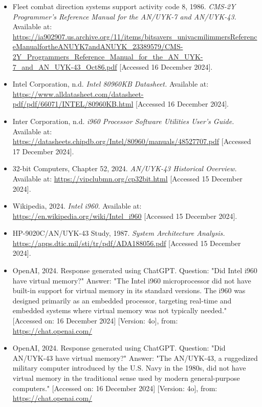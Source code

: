 \documentclass{article}
\begin{document}
\begin{itemize}
\item Fleet combat direction systems support activity code 8, 1986. \textit{CMS-2Y Programmer's Reference Manual for the AN/UYK-7 and AN/UYK-43.} Available at: \url{https://ia902907.us.archive.org/11/items/bitsavers_univacmilimmersReferenceManualfortheANUYK7andANUYK_23389579/CMS-2Y_Programmers_Reference_Manual_for_the_AN_UYK-7_and_AN_UYK-43_Oct86.pdf} [Accessed 16 December 2024].

\item Intel Corporation, n.d. \textit{Intel 80960KB Datasheet.} Available at: \url{https://www.alldatasheet.com/datasheet-pdf/pdf/66071/INTEL/80960KB.html} [Accessed 16 December 2024].

\item Inter Corporation, n.d. \textit{i960 Processor Software Utilities
User’s Guide.} Available at: \url{https://datasheets.chipdb.org/Intel/80960/manuals/48527707.pdf} [Accessed 17 December 2024].


\item 32-bit Computers, Chapter 52, 2024. \textit{AN/UYK-43 Historical Overview.} Available at: \url{https://vipclubmn.org/cp32bit.html} [Accessed 15 December 2024].

\item Wikipedia, 2024. \textit{Intel i960.} Available at: \url{https://en.wikipedia.org/wiki/Intel_i960} [Accessed 15 December 2024].

\item HP-9020C/AN/UYK-43 Study, 1987. \textit{System Architecture Analysis.} \url{https://apps.dtic.mil/sti/tr/pdf/ADA188056.pdf} [Accessed 15 December 2024].

\item OpenAI, 2024. Response generated using ChatGPT. Question: "Did Intel i960 have virtual memory?" Answer: "The Intel i960 microprocessor did not have built-in support for virtual memory in its standard versions. The i960 was designed primarily as an embedded processor, targeting real-time and embedded systems where virtual memory was not typically needed." [Accessed on: 16 December 2024] [Version: 4o], from: \url{https://chat.openai.com/}

\item OpenAI, 2024. Response generated using ChatGPT. Question: "Did AN/UYK-43 have virtual memory?" Answer: "The AN/UYK-43, a ruggedized military computer introduced by the U.S. Navy in the 1980s, did not have virtual memory in the traditional sense used by modern general-purpose computers." [Accessed on: 16 December 2024] [Version: 4o], from: \url{https://chat.openai.com/}


\end{itemize}
\end{document}
